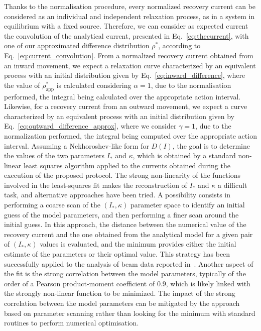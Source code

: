 {Thanks to the normalisation procedure, every normalized recovery current can be considered as an individual and independent relaxation process, as in a system in equilibrium with a fixed source. Therefore, we can consider as expected current the convolution of the analytical current, presented in Eq.~\eqref{eq:thecurrent}, with one of our approximated difference distribution $\rho^\ast$, {according to Eq.~\eqref{eq:current_convolution}}. From a normalized recovery current obtained from an inward movement, we expect a relaxation curve characterized by an equivalent process with an initial distribution given by Eq.~\eqref{eq:inward_difference}, where the value of $\rho^\ast_\text{app}$ is calculated considering $\alpha=1$, due to the normalisation performed, the integral being calculated over the appropriate action interval. Likewise, for a recovery current from an outward movement, we expect a curve characterized by an equivalent process with an initial distribution given by Eq.~\eqref{eq:outward_difference_approx}, where we consider $\gamma=1$, due to the normalization performed, the integral being computed over the appropriate action interval. Assuming a Nekhoroshev-like form for $D(I)$, the goal is to determine the values of the two parameters $I_\ast$ and $\kappa$, which is obtained by a standard non-linear least squares algorithm applied to the currents obtained during the execution of the proposed protocol. {The strong non-linearity of the functions involved in the least-squares fit makes the reconstruction of $I_\ast$ and $\kappa$ a difficult task, and alternative approaches have been tried. A possibility consists in performing a coarse scan of the $(I_\ast, \kappa)$ parameter space to identify an initial guess of the model parameters, and then performing a finer scan around the initial guess. In this approach, the distance between the numerical value of the recovery current and the one obtained from the analytical model for a given pair of $(I_\ast, \kappa)$ values is evaluated, and the minimum provides either the initial estimate of the parameters or their optimal value. This strategy has been successfully applied to the analysis of beam data reported in~\cite{montanari:ipac22-mopost043}. Another aspect of the fit is the strong correlation between the model parameters, typically of the order of a Pearson product-moment coefficient of $0.9$, which is likely linked with the strongly non-linear function to be minimized. The impact of the strong correlation between the model parameters can be mitigated by the approach based on parameter scanning rather than looking for the minimum with standard routines to perform numerical optimisation.}

}
